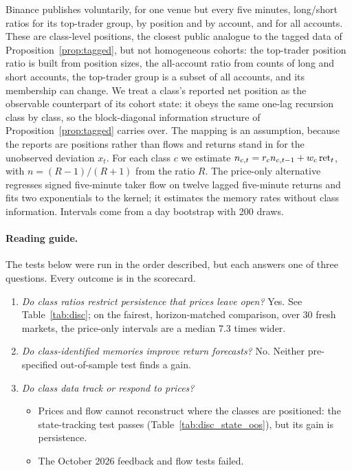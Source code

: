 Binance publishes voluntarily, for one venue but every five minutes, long/short ratios for its top-trader group, by position and by account, and for all accounts. These are class-level positions, the closest public analogue to the tagged data of Proposition~\ref{prop:tagged}, but not homogeneous cohorts: the top-trader position ratio is built from position sizes, the all-account ratio from counts of long and short accounts, the top-trader group is a subset of all accounts, and its membership can change. We treat a class's reported net position as the observable counterpart of its cohort state: it obeys the same one-lag recursion class by class, so the block-diagonal information structure of Proposition~\ref{prop:tagged} carries over. The mapping is an assumption, because the reports are positions rather than flows and returns stand in for the unobserved deviation $x_t$. For each class $c$ we estimate $n_{c,t}=r_cn_{c,t-1}+w_c\,{\rm ret}_t$, with $n=(R-1)/(R+1)$ from the ratio $R$. The price-only alternative regresses signed five-minute taker flow on twelve lagged five-minute returns and fits two exponentials to the kernel; it estimates the memory rates without class information. Intervals come from a day bootstrap with 200 draws.

\paragraph{Reading guide.} The tests below were run in the order described, but each answers one of three questions. Every outcome is in the scorecard.
\begin{enumerate}[label=(\arabic*),itemsep=1pt,topsep=2pt]
\item \emph{Do class ratios restrict persistence that prices leave open?} Yes. See Table~\ref{tab:disc}; on the fairest, horizon-matched comparison, over 30 fresh markets, the price-only intervals are a median 7.3 times wider.
\item \emph{Do class-identified memories improve return forecasts?} No. Neither pre-specified out-of-sample test finds a gain.
\item \emph{Do class data track or respond to prices?}
 \begin{itemize}[itemsep=1pt,topsep=2pt]
 \item Prices and flow cannot reconstruct where the classes are positioned: the state-tracking test passes (Table~\ref{tab:disc_state_oos}), but its gain is persistence.
 \item The October 2026 feedback and flow tests failed.
 \end{itemize}
\end{enumerate}

